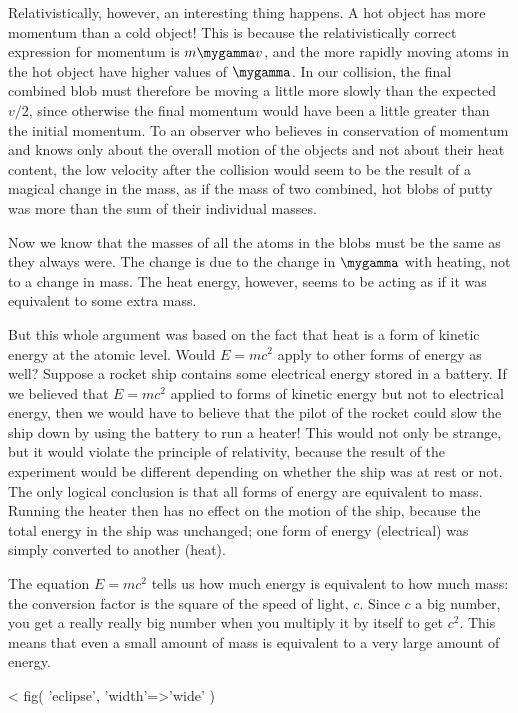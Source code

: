 Relativistically, however, an interesting thing happens. A
hot object has more momentum than a cold object! This is
because the relativistically correct expression for momentum
is $m\mygamma v$, and the more rapidly moving atoms in the hot
object have higher values of $\mygamma$.
In our collision, the final combined blob must therefore be
moving a little more slowly than the expected $v/2$, since
otherwise the final momentum would have been a little
greater than the initial momentum. To an observer who
believes in conservation of momentum and knows only about
the overall motion of the objects and not about their heat
content, the low velocity after the collision would seem
to be the result of a magical change in the mass, as if the mass
of two combined, hot blobs of putty was more than the sum of
their individual masses.

Now we know that the masses of all the atoms in the blobs
must be the same as they always were. The change is due to
the change in $\mygamma$ with heating, not to a change in mass.
The heat energy, however, seems to be acting as if it was
equivalent to some extra mass.


But this whole argument was based on the fact that heat is a
form of kinetic energy at the atomic level. Would $E=mc^2$
apply to other forms of energy as well? Suppose a rocket
ship contains some electrical energy stored in a
battery. If we believed that $E=mc^2$ applied to forms of
kinetic energy but not to electrical energy, then
we would have to believe that the pilot of the rocket could
slow the ship down by using the battery to run a heater!
This would not only be strange, but it would violate the
principle of relativity, because the result of the
experiment would be different depending on whether the ship
was at rest or not. The only logical conclusion is that all
forms of energy are equivalent to mass. Running the heater
then has no effect on the motion of the ship, because the
total energy in the ship was unchanged; one form of energy (electrical)
was simply converted to another (heat).

The equation $E=mc^2$
tells us how much energy is equivalent to how much mass: the conversion factor is the square
of the speed of light, $c$. Since $c$ a big number, you get a really really big number
when you multiply it by itself to get $c^2$. This means that even a small amount of mass
is equivalent to a very large amount of energy. 

<%
  fig(
    'eclipse',
    {
      'width'=>'wide'
    }
  )

